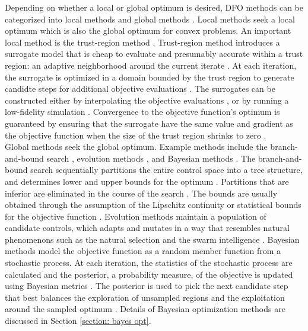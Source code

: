 Depending on whether a local or global optimum is desired,
DFO methods can be categorized into local methods and global methods \cite{gradfreereview}.
Local methods seek a local optimum which is also the global optimum for convex problems. 
An important local method is the
trust-region method \cite{trust region review}. Trust-region method introduces a surrogate model that is
cheap to evaluate and presumably accurate within a trust region: an adaptive neighborhood around the current iterate \cite{trust region review}. 
At each iteration, the surrogate is optimized in a domain bounded by the trust region to generate
candidte steps for additional objective evaluations \cite{trust region review}.
The surrogates can be constructed either by interpolating the objective evaluations \cite{linear trust region, trustregionwild}, or by running a low-fidelity simulation \cite{MFO trust region,
Alexandrov trust region}.
Convergence to the objective function's optimum is guaranteed by ensuring that
the surrogate have the
same value and gradient as the objective function when the size of the trust region shrinks to zero
\cite{trustregionconn, trustregionwild}.\\

Global methods seek the global optimum. 
Example methods include the branch-and-bound search \cite{Branch and Bound}, evolution methods \cite{evolution review}, and 
Bayesian methods \cite{practical Bayesian, Locatelli, prob of improve}. 
The branch-and-bound search sequentially partitions the entire control space into a tree structure, and
determines lower and upper bounds for the optimum
\cite{Branch and Bound}. Partitions that are inferior are eliminated 
in the course of the search \cite{Branch and Bound}. The bounds are usually obtained through the assumption of the
Lipschitz continuity or statistical bounds for the objective function \cite{Branch and Bound}. 
Evolution methods maintain a population
of candidate controls, which adapts and mutates in a way that resembles natural phenomenons
such as the natural selection \cite{genetic algo, cuckoo} 
and the swarm intelligence \cite{particle swarm}.
Bayesian methods model the objective function as a random member function from a stochastic process.
At each iteration, the statistics of the stochastic process are calculated 
and the posterior, a probability measure, of the objective 
is updated using Bayesian metrics \cite{practical Bayesian, review EI}. 
The posterior is used to pick the next candidate step
that best balances the exploration of unsampled regions and the exploitation around the sampled
optimum \cite{Locatelli, jones1998, GP bandit}. Details of Bayesian optimization methods are discussed in Section \ref{section: bayes opt}.\\

